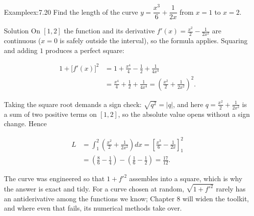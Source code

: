 \documentclass[a4paper,12pt,oneside]{memoir}
\begin{document}
\begin{workedexample}
\begin{envexample}{Example}{ex:7.20}{}
Find the length of the curve \(y = \dfrac{x^{3}}{6} + \dfrac{1}{2x}\) from \(x = 1\) to \(x = 2\).
\end{envexample}
\begin{envsolution}{Solution}{}{}
On \([1, 2]\) the function and its derivative \(f'(x) = \tfrac{x^{2}}{2} - \tfrac{1}{2x^{2}}\) are continuous (\(x = 0\) is safely outside the interval), so the formula applies. Squaring and adding \(1\) produces a perfect square:

\[ \begin{aligned}
          1 + \bigl[f'(x)\bigr]^{2} &= 1 + \frac{x^{4}}{4} - \frac{1}{2} + \frac{1}{4x^{4}} \\[2pt]
            &= \frac{x^{4}}{4} + \frac{1}{2} + \frac{1}{4x^{4}} = \left(\frac{x^{2}}{2} + \frac{1}{2x^{2}}\right)^{2}.
        \end{aligned} \]

Taking the square root demands a sign check: \(\sqrt{q^{2}} = \lvert q\rvert\), and here \(q = \tfrac{x^{2}}{2} + \tfrac{1}{2x^{2}}\) is a sum of two positive terms on \([1, 2]\), so the absolute value opens without a sign change. Hence

\[ \begin{aligned}
          L &= \int_{1}^{2} \left(\frac{x^{2}}{2} + \frac{1}{2x^{2}}\right) dx = \left[\frac{x^{3}}{6} - \frac{1}{2x}\right]_{1}^{2} \\[2pt]
            &= \left(\frac{8}{6} - \frac{1}{4}\right) - \left(\frac{1}{6} - \frac{1}{2}\right) = \frac{17}{12}.
        \end{aligned} \]

The curve was engineered so that \(1 + f'^{2}\) assembles into a square, which is why the answer is exact and tidy. For a curve chosen at random, \(\sqrt{1 + f'^{2}}\) rarely has an antiderivative among the functions we know; Chapter 8 will widen the toolkit, and where even that fails, its numerical methods take over. \qedmark
\end{envsolution}
\end{workedexample}
\end{document}
